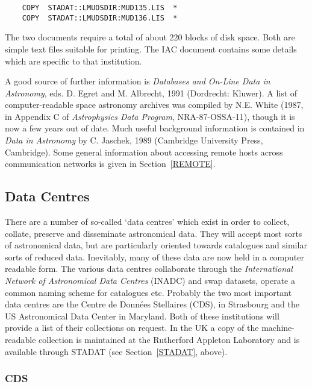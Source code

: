 \begin{verbatim}
    COPY  STADAT::LMUDSDIR:MUD135.LIS  *
    COPY  STADAT::LMUDSDIR:MUD136.LIS  *
\end{verbatim}

The two documents require a total of about 220 blocks of disk space. 
Both are simple text files suitable for printing. The IAC document 
contains some details which are specific to that institution.

A good source of further information is {\it Databases and On-Line Data 
in Astronomy}, eds. D. Egret and M. Albrecht, 1991 (Dordrecht: Kluwer). 
A list of computer-readable space astronomy archives was compiled by 
N.E. White (1987, in Appendix C of {\it Astrophysics Data Program}, 
NRA-87-OSSA-11), though it is now a few years out of date. Much useful 
background information is contained in {\it Data in Astronomy} by C. 
Jaschek, 1989 (Cambridge University Press, Cambridge). Some general 
information about accessing remote hosts across communication networks 
is given in Section~\ref{REMOTE}.

\subsection{Data Centres
\label{INADC}}

There are a number of so-called `data centres' which exist in order to
collect, collate, preserve and disseminate astronomical data. They will
accept most sorts of astronomical data, but are particularly oriented
towards catalogues and similar sorts of reduced data. Inevitably, many
of these data are now held in a computer readable form. The various data
centres collaborate through the {\it International Network of 
Astronomical Data Centres} (INADC) and swap datasets, operate a common 
naming scheme for catalogues etc. Probably the two most important data 
centres are the Centre de Donn\'{e}es Stellaires (CDS), in Strasbourg 
and the US Astronomical Data Center in Maryland. Both of these 
institutions will provide a list of their collections on request. In the
UK a copy of the machine-readable collection is maintained at the 
Rutherford Appleton Laboratory and is available through STADAT (see 
Section~\ref{STADAT}, above).

\subsubsection{CDS
\label{CDS}}

